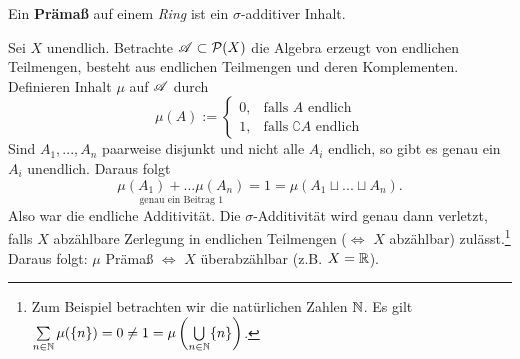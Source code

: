 \begin{definition}
\begin{mdframed}
Ein \textbf{Prämaß} auf einem \emph{Ring} ist ein $\sigma$-additiver Inhalt.
\end{mdframed}
\end{definition}

\begin{example}
Sei $X$ unendlich. Betrachte $\AA \subset \mathcal{P}(X)$ die Algebra erzeugt von endlichen Teilmengen, besteht aus endlichen Teilmengen und deren Komplementen. Definieren Inhalt $\mu$ auf $\AA$ durch
$$ \mu (A) := \begin{cases}
	0, & \text{falls } A \text{ endlich} \\
	1, & \text{falls } \complement A \text{ endlich}
	\end{cases}$$
Sind $A_1,...,A_n$ paarweise disjunkt und nicht alle $A_i$ endlich, so gibt es genau ein $A_i$ unendlich. Daraus folgt
$$\underset{\text{genau ein Beitrag }1}{\mu(A_1)+...\mu(A_n)} = 1 = \mu(A_1 \sqcup ... \sqcup A_n).$$
Also war die endliche Additivität. Die $\sigma$-Additivität wird genau dann verletzt, falls $X$ abzählbare Zerlegung in endlichen Teilmengen ($\iff$ $X$ abzählbar) zulässt.\footnote{Zum Beispiel betrachten wir die natürlichen Zahlen $\N$. Es gilt $\sum\limits_{n\in \N} \mu (\{n\}) =0 \neq 1 = \mu \left( \bigcup\limits_{n \in \N} \{n\} \right)$.} Daraus folgt: $\mu $ Prämaß $\iff$ $X$ überabzählbar (z.B. $X = \R$).
\end{example}

